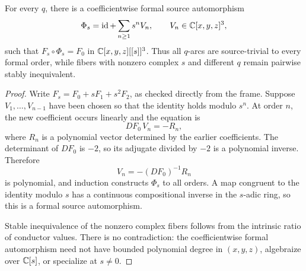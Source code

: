 \begin{proposition}
\label{prop:formal-stable-separation}
For every \(q\), there is a coefficientwise formal source automorphism
\[
\Phi_s=\operatorname{id}+\sum_{n\ge1}s^nV_n,
\qquad V_n\in\mathbb C[x,y,z]^3,
\]
such that \(F_s\circ\Phi_s=F_0\) in \(\mathbb C[x,y,z][[s]]^3\).  Thus all
\(q\)-arcs are source-trivial to every formal order, while fibers with
nonzero complex \(s\) and different \(q\) remain pairwise stably
inequivalent.
\end{proposition}

\begin{proof}
Write \(F_s=F_0+sF_1+s^2F_2\), as checked directly from the frame.  Suppose
\(V_1,\ldots,V_{n-1}\) have been chosen so that the identity holds modulo
\(s^n\).  At order \(n\), the new coefficient occurs linearly and the
equation is
\[
DF_0\,V_n=-R_n,
\]
where \(R_n\) is a polynomial vector determined by the earlier
coefficients.  The determinant of \(DF_0\) is \(-2\), so its adjugate divided
by \(-2\) is a polynomial inverse.  Therefore
\[
V_n=-(DF_0)^{-1}R_n
\]
is polynomial, and induction constructs \(\Phi_s\) to all orders.  A map
congruent to the identity modulo
\(s\) has a continuous compositional inverse in the \(s\)-adic ring, so this
is a formal source automorphism.

Stable inequivalence of the nonzero complex fibers follows from the
intrinsic ratio of conductor values.  There is no contradiction: the
coefficientwise formal automorphism need not have bounded polynomial degree
in \((x,y,z)\), algebraize over \(\mathbb C[s]\), or specialize at \(s\ne0\).
\end{proof}
